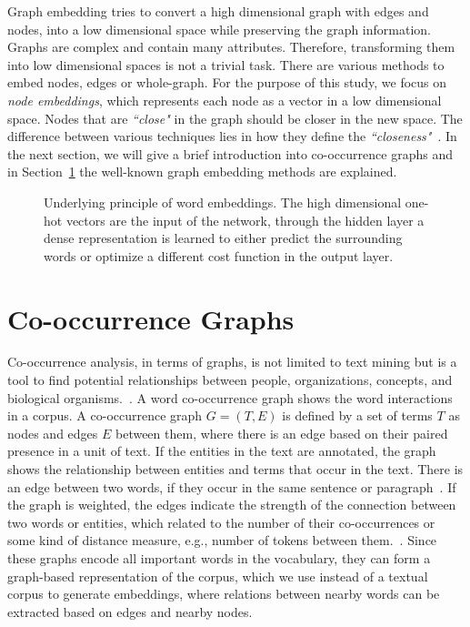 \noindent
Graph embedding tries to convert a high dimensional graph with edges and nodes, into a low dimensional space while preserving the graph information. Graphs are complex and contain many attributes. Therefore, transforming them into low dimensional spaces is not a trivial task. There are various methods to embed nodes, edges or whole-graph. For the purpose of this study, we focus on \emph{node embeddings}, which represents each node as a vector in a low dimensional space. Nodes that are \emph{``close"} in the graph should be closer in the new space. The difference between various techniques lies in how they define the  \emph{``closeness"}~. In the next section, we will give a brief introduction into co-occurrence graphs and in Section~\ref{sec:graph} the well-known graph embedding methods are explained.  
\begin{figure}
\centering 
\resizebox{0.8\textwidth}{0.48\textwidth}{      

}
\caption{Underlying principle of word embeddings. The high dimensional one-hot vectors are the input of the network, through the hidden layer a dense representation is learned to either predict the surrounding words or optimize a different cost function in the output layer.}
\label{fig:emb}
\end{figure}

\section{Co-occurrence Graphs}
\label{sec:graph}
Co-occurrence analysis, in terms of graphs, is not limited to text mining but is a tool to find potential relationships between people, organizations, concepts, and biological organisms.~. A word co-occurrence graph shows the word interactions in a corpus. A co-occurrence graph $G=(T,E)$ is defined by a set of terms $T$ as nodes and edges $E$ between them, where there is an edge based on their paired presence in a unit of text. If the entities in the text are annotated, the graph shows the relationship between entities and terms that occur in the text. There is an edge between two words, if they occur in the same sentence or paragraph~. If the graph is weighted, the edges indicate the strength of
the connection between two words or entities, which related to the number of their co-occurrences or some kind of distance measure, e.g., number of tokens between them.~. Since these graphs encode all important words in the vocabulary, they can form a graph-based representation of the corpus, which we use instead of a textual corpus to generate embeddings, where relations between nearby words can be extracted based on edges and nearby nodes.

